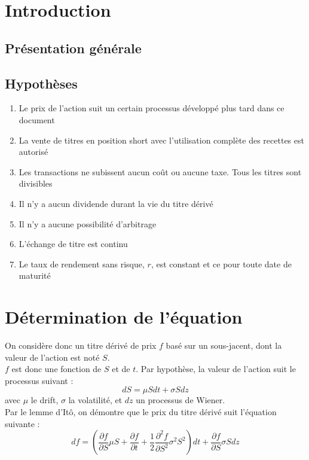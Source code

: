\section{Introduction}
\subsection{Présentation générale}

\subsection{Hypothèses}
\begin{enumerate}
	\item Le prix de l'action suit un certain processus développé plus tard dans ce document
	\item La vente de titres en position short avec l'utilisation complète des recettes est autorisé
	\item Les transactions ne subissent aucun coût ou aucune taxe. Tous les titres sont divisibles
	\item Il n'y a aucun dividende durant la vie du titre dérivé
	\item Il n'y a aucune possibilité d'arbitrage
	\item L'échange de titre est continu
	\item Le taux de rendement sans risque, $r$, est constant et ce pour toute date de maturité
\end{enumerate}

\section{Détermination de l'équation}
On considère donc un titre dérivé de prix $f$ basé sur un sous-jacent, dont la valeur de l'action est noté $S$. \\
$f$ est donc une fonction de $S$ et de $t$. Par hypothèse, la valeur de l'action suit le processus suivant :
	\begin{equation}\label{1} dS=\mu Sdt + \sigma S dz\end{equation}
avec $\mu$ le drift, $\sigma$ la volatilité, et $dz$ un processus de Wiener. \\
Par le lemme d'Itô, on démontre que le prix du titre dérivé suit l'équation suivante : 
\begin{equation} \label{2} df=\left(\frac{\partial f}{\partial S} \mu S + \frac{\partial f}{\partial t} + \frac{1}{2}\frac{\partial^2 f}{\partial S^2} \sigma^2S^2\right)dt + \frac{\partial f}{\partial S} \sigma S dz\end{equation}

